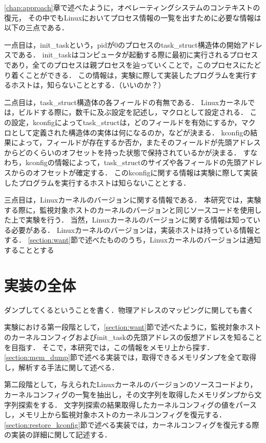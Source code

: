 \ref{chap:approach}章で述べたように，オペレーティングシステムのコンテキストの復元，
その中でもLinuxにおいてプロセス情報の一覧を出すために必要な情報は以下の三点である．

一点目は，init\_taskという，pidが0のプロセスのtask\_struct構造体の開始アドレスである．
init\_taskはコンピュータが起動する際に最初に実行されるプロセスであり，全てのプロセスは親プロセスを辿っていくことで，このプロセスにたどり着くことができる．
この情報は，実験に際して実装したプログラムを実行するホストは，知らないこととする．（いいのか？）

二点目は，task\_struct構造体の各フィールドの有無である．
Linuxカーネルでは，ビルドする際に，数千に及ぶ設定を記述し，マクロとして設定される．
この設定，kconfigによってtask\_structは，どのフィールドを有効にするか，マクロとして定義された構造体の実体は何になるのか，などが決まる．
kconfigの結果によって，フィールドが存在するか否か，またそのフィールドが先頭アドレスからどのくらいのオフセットを持った状態で保持されているかが決まる．
すなわち，kconfigの情報によって，task\_structのサイズや各フィールドの先頭アドレスからのオフセットが確定する．
このkconfigに関する情報は実験に際して実装したプログラムを実行するホストは知らないこととする．

三点目は，Linuxカーネルのバージョンに関する情報である．
本研究では，実験する際に，監視対象ホストのカーネルのバージョンと同じソースコードを使用した上で実験を行う．
当然，Linuxカーネルのバージョンに関する情報は知っている必要がある．
Linuxカーネルのバージョンは，実装ホストは持っている情報とする．
\ref{section:want}節で述べたもののうち，Linuxカーネルのバージョンは通知することとする

\section{実装の全体}

ダンプしてくるということを書く．物理アドレスのマッピングに関しても書く

実験における第一段階として，\ref{section:want}節で述べたように，監視対象ホストのカーネルコンフィグおよびinit\_taskの先頭アドレスの仮想アドレスを知ることを目指す．
そこで，本研究では，この情報をメモリ上から探す．\ref{section:mem_dump}節で述べる実装では，取得できるメモリダンプを全て取得し，解析する手法に関して述べる．

第二段階として，与えられたLinuxカーネルのバージョンのソースコードより，カーネルコンフィグの一覧を抽出し，その文字列を取得したメモリダンプから文字列探索をする．
文字列探索の結果取得したカーネルコンフィグの値をパースし，メモリ上から監視対象ホストのカーネルコンフィグを復元する．
\ref{section:restore_kconfig}節で述べる実装では，カーネルコンフィグを復元する際の実装の詳細に関して記述する．

